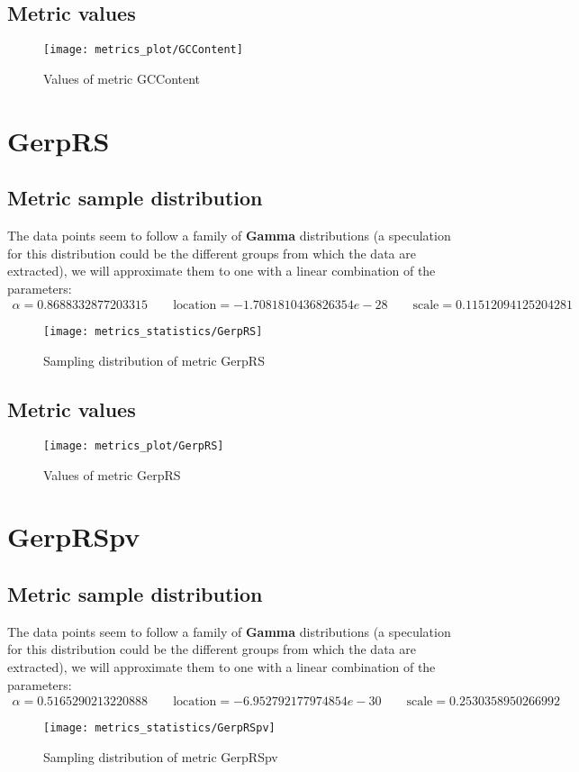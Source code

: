 \documentclass[\main/main.tex]{subfiles}
\begin{document}
\subsection{Metric values}
\begin{figure}
  \texttt{[image: metrics\_plot/GCContent]}
  \caption{Values of metric GCContent}
\end{figure}

\clearpage
\section{GerpRS}
\subsection{Metric sample distribution}
The data points seem to follow a family of \textbf{Gamma} distributions (a speculation for this distribution could be the different groups from which the data are extracted), we will approximate them to one with a linear combination of the parameters:
\begin{align*}
  \alpha   = 0.8688332877203315    \qquad  \text{location} = -1.7081810436826354e-28 \qquad \text{scale} = 0.11512094125204281
\end{align*}
\begin{figure}
  \texttt{[image: metrics\_statistics/GerpRS]}
  \caption{Sampling distribution of metric GerpRS}
\end{figure}
\subsection{Metric values}
\begin{figure}
  \texttt{[image: metrics\_plot/GerpRS]}
  \caption{Values of metric GerpRS}
\end{figure}

\clearpage
\section{GerpRSpv}
\subsection{Metric sample distribution}
The data points seem to follow a family of \textbf{Gamma} distributions (a speculation for this distribution could be the different groups from which the data are extracted), we will approximate them to one with a linear combination of the parameters:
\begin{align*}
  \alpha   = 0.5165290213220888    \qquad  \text{location} = -6.952792177974854e-30 \qquad \text{scale} = 0.2530358950266992
\end{align*}
\begin{figure}
  \texttt{[image: metrics\_statistics/GerpRSpv]}
  \caption{Sampling distribution of metric GerpRSpv}
\end{figure}
\end{document}
